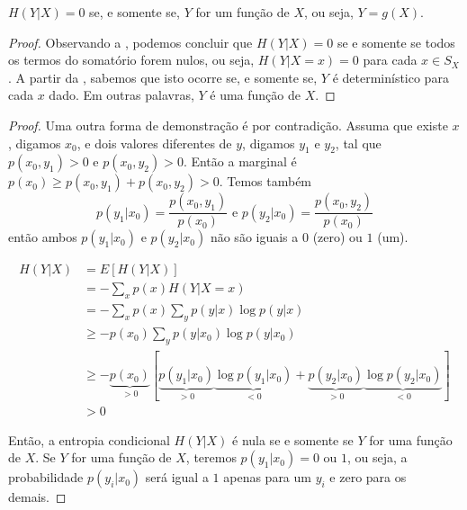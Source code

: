 \begin{proposition}
$H(Y|X) = 0$ se, e somente se, $Y$ for um função de $X$, ou seja, $Y = g(X)$.
\end{proposition}
\begin{proof}
  Observando a , podemos concluir que $H(Y|X) = 0$
  se e somente se todos os termos do somatório forem nulos, ou seja,
  $H(Y|X = x) = 0$ para cada $x \in S_X$.
  A partir da , sabemos que isto ocorre se, e somente se,
  $Y$ é determinístico para cada $x$ dado. Em outras palavras, $Y$ é uma função de $X$.
\end{proof}
\begin{proof}
  Uma outra forma de demonstração é por contradição. Assuma que existe $x$, digamos $x_0$, e dois valores diferentes de $y$, digamos $y_1$ e $y_2$,
  tal que $p(x_0,y_1) > 0$ e $p(x_0,y_2)>0$. Então a marginal é $p(x_0) \geq p(x_0,y_1) + p(x_0,y_2) > 0$.
  Temos também
  \begin{equation}
  p(y_1|x_0) = \frac{p(x_0,y_1)}{p(x_0)} \text{ e } p(y_2|x_0) = \frac{p(x_0,y_2)}{p(x_0)}
  \end{equation}
  então ambos $p(y_1|x_0)$ e $p(y_2|x_0)$ não são iguais a $0$ (zero) ou $1$ (um).

  \begin{subequations}
    \begin{align}
      H(Y|X) &= E[H(Y|X)] \\
        &= - \sum_x p(x) H(Y|X=x) \\
        &= - \sum_x p(x) \sum_y p(y|x) \log p(y|x) \\
        &\geq - p(x_0) \sum_y p(y|x_0) \log p(y|x_0) \\
        &\geq - \underbrace{p(x_0)}_{>0} [ \underbrace{p(y_1|x_0)}_{>0} \underbrace{\log p(y_1|x_0)}_{<0} + \underbrace{p(y_2|x_0)}_{>0} \underbrace{\log p(y_2|x_0)}_{<0} ]  \\
        &> 0
    \end{align}
  \end{subequations}

  Então, a entropia condicional $H(Y|X)$ é nula se e somente se $Y$ for uma função de $X$.
  Se $Y$ for uma função de $X$, teremos $p(y_1|x_0) = 0 \text{ ou } 1$, ou seja, a probabilidade
  $p(y_i|x_0)$ será igual a $1$ apenas para um $y_i$ e zero para os demais.
\end{proof}


